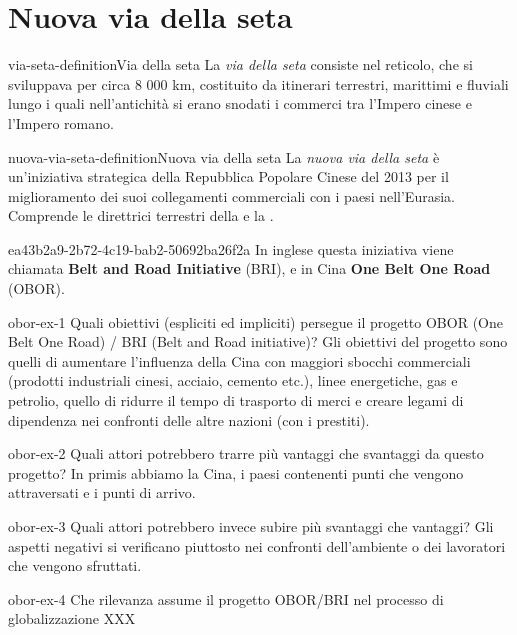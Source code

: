 \documentclass[preview]{standalone}
\begin{document}
\genpage

\section{Nuova via della seta}

\begin{snippetdefinition}{via-seta-definition}{Via della seta}
    La \textit{via della seta} consiste nel reticolo, che si sviluppava per circa 8 000 km,
    costituito da itinerari terrestri, marittimi e fluviali lungo i quali nell'antichità si
    erano snodati i commerci tra l'Impero cinese e l'Impero romano.
\end{snippetdefinition}

\begin{snippetdefinition}{nuova-via-seta-definition}{Nuova via della seta}
    La \textit{nuova via della seta} è un'iniziativa strategica della Repubblica
    Popolare Cinese del 2013 per il miglioramento dei suoi collegamenti commerciali con
    i paesi nell'Eurasia. Comprende le direttrici terrestri della 
    e la .
\end{snippetdefinition}

\begin{snippet}{ea43b2a9-2b72-4c19-bab2-50692ba26f2a}
    In inglese questa iniziativa viene chiamata \textbf{Belt and Road Initiative} (BRI),
e in Cina \textbf{One Belt One Road} (OBOR).
\end{snippet}

\begin{snippetexercise}{obor-ex-1}
    {Quali obiettivi (espliciti ed impliciti) persegue il progetto OBOR (One Belt One Road) / BRI (Belt and Road initiative)?}
    Gli obiettivi del progetto sono quelli di aumentare l'influenza della Cina
    con maggiori sbocchi commerciali (prodotti industriali cinesi, acciaio, cemento etc.),
    linee energetiche, gas e petrolio, quello di ridurre il tempo di trasporto di merci
    e creare legami di dipendenza nei confronti delle altre nazioni (con i prestiti).
\end{snippetexercise}

\begin{snippetexercise}{obor-ex-2}
    {Quali attori potrebbero trarre più vantaggi che svantaggi da questo progetto?}
    In primis abbiamo la Cina, i paesi contenenti punti che vengono attraversati
    e i punti di arrivo.
\end{snippetexercise}

\begin{snippetexercise}{obor-ex-3}
    {Quali attori potrebbero invece subire più svantaggi che vantaggi?}
    Gli aspetti negativi si verificano piuttosto nei confronti dell'ambiente o
    dei lavoratori che vengono sfruttati.
\end{snippetexercise}

\begin{snippetexercise}{obor-ex-4}
    {Che rilevanza assume il progetto OBOR/BRI nel processo di globalizzazione}
    XXX
\end{snippetexercise}
\end{document}
